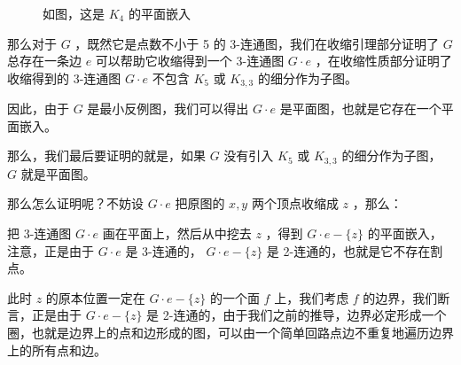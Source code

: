 \documentclass[11pt, a4paper]{ctexart}
\begin{document}
\begin{figure}[H]
    \centering
    \caption{如图，这是 $K_4$ 的平面嵌入}
\end{figure}

那么对于 $G$ ，既然它是点数不小于 5 的 3-连通图，我们在收缩引理部分证明了 $G$ 总存在一条边 $e$ 可以帮助它收缩得到一个 3-连通图 $G\cdot e$ ，在收缩性质部分证明了收缩得到的 3-连通图 $G\cdot e$ 不包含 $K_{5}$ 或 $K_{3,3}$ 的细分作为子图。

因此，由于 $G$ 是最小反例图，我们可以得出 $G\cdot e$ 是平面图，也就是它存在一个平面嵌入。

那么，我们最后要证明的就是，如果 $G$ 没有引入 $K_{5}$ 或 $K_{3,3}$ 的细分作为子图， $G$ 就是平面图。

那么怎么证明呢？不妨设 $G\cdot e$ 把原图的 $x,y$ 两个顶点收缩成 $z$ ，那么：

把 3-连通图 $G\cdot e$ 画在平面上，然后从中挖去 $z$ ，得到 $G\cdot e-\{z\}$ 的平面嵌入，注意，正是由于 $G\cdot e$ 是 3-连通的， $G\cdot e-\{z\}$ 是 2-连通的，也就是它不存在割点。

此时 $z$ 的原本位置一定在 $G\cdot e-\{z\}$ 的一个面 $f$ 上，我们考虑 $f$ 的边界，我们断言，正是由于 $G\cdot e-\{z\}$ 是 2-连通的，由于我们之前的推导，边界必定形成一个圈，也就是边界上的点和边形成的图，可以由一个简单回路点边不重复地遍历边界上的所有点和边。
\end{document}
